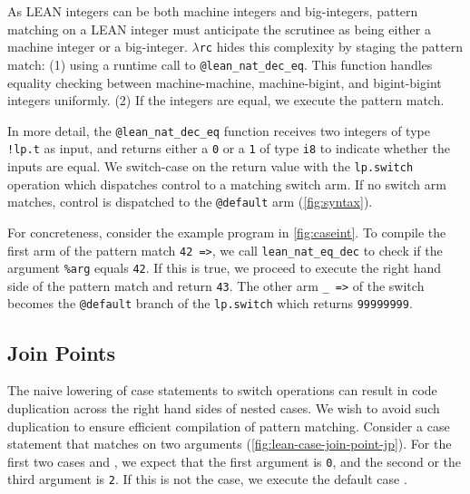 \documentclass[conference]{IEEEtran}
\DeclareRobustCommand\circled[1]{\tikz[baseline=(char.base)]{
            \node[shape=circle,fill=pairedOneLightBlue,inner sep=1pt] (char) {#1};}}
\newcommand{\lpswitch}{\textcolor{pairedTwoDarkBlue}{\texttt{lp.switch}}}
\newcommand{\lambdapure}{\ensuremath{\lambda}\texttt{pure}}
\newcommand{\lambdarc}{\ensuremath{\lambda}\texttt{rc}}
\begin{document}
As LEAN integers can be both machine integers and big-integers, pattern matching on a LEAN integer
must anticipate the scrutinee as being either a machine integer or a big-integer. \lambdarc{} hides this
complexity by staging the pattern match:
(1)  using a runtime call to \texttt{@lean\_nat\_dec\_eq}.
This function handles equality checking between machine-machine, machine-bigint, and bigint-bigint integers uniformly.
(2) If the integers are equal, we execute the pattern match.



In more detail, the \texttt{@lean\_nat\_dec\_eq} function receives two integers of type
\texttt{!lp.t} as input, and returns either a \texttt{0} or a \texttt{1} of type \texttt{i8}
to indicate
whether the inputs are equal.
We switch-case on the return value with the \texttt{lp.switch} operation which dispatches control to a
matching switch arm. If no switch arm matches, control is dispatched to the \texttt{@default} arm
(\autoref{fig:syntax}).


For concreteness, consider the example program in \autoref{fig:caseint}. To compile the
first arm of the pattern match \texttt{42 =>}, we call \texttt{lean\_nat\_eq\_dec}
to check if the argument \texttt{\%arg} equals \texttt{42}. If this is true,
we proceed to execute the right hand side of the pattern match and return \texttt{43}.
The other arm \texttt{\_ =>} of the switch becomes the \texttt{@default} branch of the
\lpswitch{} which returns \texttt{99999999}.


\subsection{Join Points}

The naive lowering of case statements to switch operations can result in
code duplication across the right hand sides of nested cases.
We wish to avoid such duplication to ensure efficient compilation of pattern
matching. Consider a case statement that matches on two arguments
(\autoref{fig:lean-case-join-point-jp}). For the first two cases \circled{1}
and \circled{2}, we expect that the first argument is \texttt{0}, and the
second or the third argument is \texttt{2}. If this is not the case,
we execute the default case \circled{3}.
\end{document}
